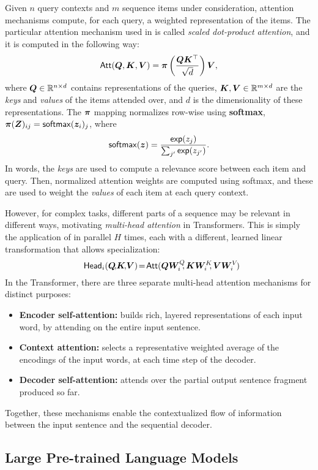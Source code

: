 Given $n$ query contexts and $m$ sequence items under consideration,
attention mechanisms compute, for each query, a weighted
representation of the items. The particular attention mechanism used
in \citet{vaswani2017attention} is called \emph{scaled dot-product
    attention}, and it is computed in the following way:
%
\begin{equation}
    \operatorname{\mathsf{Att}}(\bm{Q}, \bm{K}, \bm{V}) = \bm{\pi}
    \left(\frac{\bm{Q}\bm{K}^\top}{\sqrt{d}}\right) \bm{V},
    \label{eq:att_scaled_dot}
\end{equation}
%
where $\bm{Q} \in \mathbb{R}^{n \times d}$ contains representations of the
queries, $\bm{K}, \bm{V} \in \mathbb{R}^{m \times d}$
are the \emph{keys} and \emph{values} of the items attended over,
and $d$ is the dimensionality of these
representations.
The $\bm{\pi}$ mapping normalizes row-wise using \textbf{softmax},
$\bm{\pi}(\bm{Z})_{ij} = \operatorname*{\mathsf{softmax}}(\bm{z}_i)_j$, where
%
\begin{equation}\label{eq:softmax}
    \operatorname*{\mathsf{softmax}}(\bm{z}) = \frac{\operatorname*{\mathsf{exp}}(z_j)}{\sum_{j'} \operatorname*{\mathsf{exp}}(z_{j'})}.
\end{equation}
%
In words, the \emph{keys} are used to compute a relevance score
between each item and query. Then, normalized attention weights are computed
using softmax, and these are used to weight the \emph{values} of each item at each
query context.

However, for complex tasks, different parts of a sequence may be relevant in
different ways, motivating \emph{multi-head attention} in Transformers.
This is simply the application of
 in parallel $H$ times, each with a different,
learned linear transformation that allows specialization:
%
\begin{equation}\label{eq:head}%
    \hspace{-.01ex}%
    \ath_i(\bm{Q}\!,\!\bm{K}\!,\!\bm{V})\!=\!\att(\bm{QW}_i^Q\!\!,\bm{KW}_i^K\!\!,\bm{VW}_i^V\!)%
    \hspace{-1.5ex}%
\end{equation}
%
In the Transformer, there are three separate multi-head attention mechanisms for
distinct purposes:
\begin{itemize}
    \item \textbf{Encoder self-attention:} builds rich, layered representations of
          each input word, by attending on the entire input sentence.
    \item \textbf{Context attention:} selects
          a representative weighted average of the encodings of the input words, at each
          time step of the decoder.
    \item \textbf{Decoder self-attention:} attends over the partial output sentence
          fragment produced so far.
\end{itemize}
Together, these mechanisms enable the contextualized flow of information between
the input sentence and the sequential decoder.

\subsection{Large Pre-trained Language Models}
